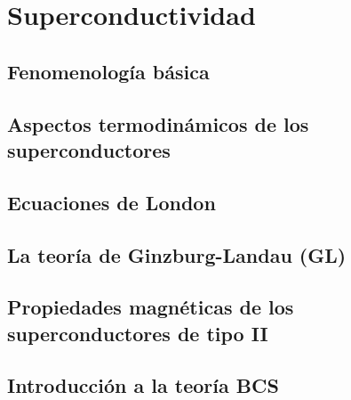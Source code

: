 \chapter{Superconductividad} \label{Ch:11}

\section{Fenomenología básica}

\section{Aspectos termodinámicos de los superconductores}

\section{Ecuaciones de London}

\section{La teoría de Ginzburg-Landau (GL)}

\section{Propiedades magnéticas de los superconductores de tipo II}

\section{Introducción a la teoría BCS}

